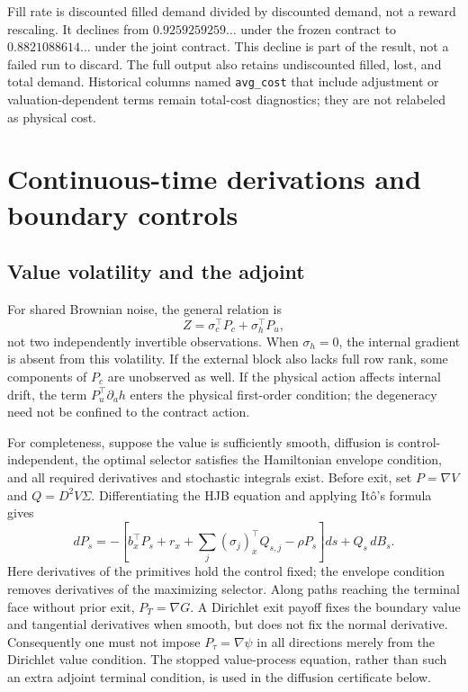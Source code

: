 Fill rate is discounted filled demand divided by discounted demand, not a reward rescaling. It declines from $0.9259259259\ldots$ under the frozen contract to $0.8821088614\ldots$ under the joint contract. This decline is part of the result, not a failed run to discard. The full output also retains undiscounted filled, lost, and total demand. Historical columns named \texttt{avg\_cost} that include adjustment or valuation-dependent terms remain total-cost diagnostics; they are not relabeled as physical cost.

\section{Continuous-time derivations and boundary controls}\label{ec:boundary-history}
\subsection{Value volatility and the adjoint}
For shared Brownian noise, the general relation is
\[
 Z=\sigma_c^\top P_c+\sigma_h^\top P_u,
\]
not two independently invertible observations. When $\sigma_h=0$, the internal gradient is absent from this volatility. If the external block also lacks full row rank, some components of $P_c$ are unobserved as well. If the physical action affects internal drift, the term $P_u^\top\partial_a h$ enters the physical first-order condition; the degeneracy need not be confined to the contract action.

For completeness, suppose the value is sufficiently smooth, diffusion is control-independent, the optimal selector satisfies the Hamiltonian envelope condition, and all required derivatives and stochastic integrals exist. Before exit, set $P=\nabla V$ and $Q=D^2V\Sigma$. Differentiating the HJB equation and applying It\^o's formula gives
\begin{equation}
 dP_s=-\left[b_x^\top P_s+r_x+\sum_j(\sigma_j)_x^\top Q_{s,j}-\rho P_s\right]ds+Q_s\,dB_s.
\end{equation}
Here derivatives of the primitives hold the control fixed; the envelope condition removes derivatives of the maximizing selector. Along paths reaching the terminal face without prior exit, $P_T=\nabla G$. A Dirichlet exit payoff fixes the boundary value and tangential derivatives when smooth, but does not fix the normal derivative. Consequently one must not impose $P_\tau=\nabla\psi$ in all directions merely from the Dirichlet value condition. The stopped value-process equation, rather than such an extra adjoint terminal condition, is used in the diffusion certificate below.

